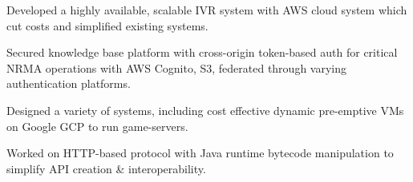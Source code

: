 \documentclass[a4paper]{deedy-resume}
\begin{document}
\begin{minipage}[t]{0.63\textwidth}
\sectionspace



\begin{tightitemize}
\item Developed a highly available, scalable IVR system
	  with AWS cloud system which cut costs and simplified
	  existing systems.
\item Secured knowledge base platform with
	  cross-origin token-based auth
	  for critical NRMA operations
	  with AWS Cognito, S3, federated through varying
	  authentication platforms.
\end{tightitemize}

\sectionspace



\begin{tightitemize}
\item Designed a variety of systems, including cost effective
	  dynamic pre-emptive VMs on Google GCP to run game-servers.
\item Worked on HTTP-based protocol with Java runtime bytecode
	  manipulation to simplify API creation \& interoperability.
\end{tightitemize}

\sectionspace

\end{minipage} %
\end{document}
